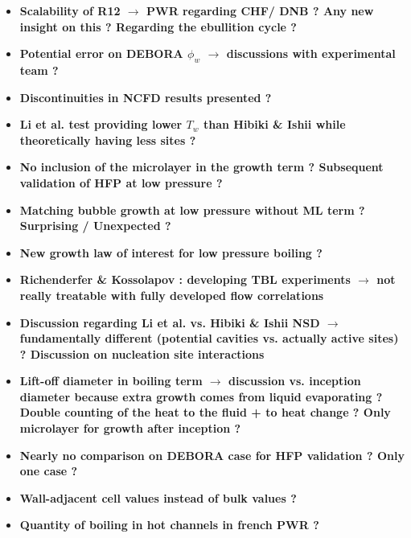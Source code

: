 \documentclass[8pt, a4paper]{article}
\begin{document}
\begin{itemize}
\setlength{\itemsep}{20pt}

\item \textbf{Scalability of R12 $\rightarrow$ PWR regarding CHF/ DNB ? Any new insight on this ? Regarding the ebullition cycle ?}

\item \textbf{Potential error on DEBORA $\phi_{w}$ $\rightarrow$ discussions with experimental team ? }

\item \textbf{Discontinuities in NCFD results presented ?}

\item \textbf{Li et al. test providing lower $T_{w}$ than Hibiki \& Ishii while theoretically having less sites ?}

\item \textbf{No inclusion of the microlayer in the growth term ? Subsequent validation of HFP at low pressure ?}

\item \textbf{Matching bubble growth at low pressure without ML term ? Surprising / Unexpected ?}

\item \textbf{New growth law of interest for low pressure boiling ?}

\item \textbf{Richenderfer \& Kossolapov : developing TBL experiments $\rightarrow$ not really treatable with fully developed flow correlations}

\item \textbf{Discussion regarding Li et al. vs. Hibiki \& Ishii NSD $\rightarrow$ fundamentally different (potential cavities vs. actually active sites) ? Discussion on nucleation site interactions}

\item \textbf{Lift-off diameter in boiling term $\rightarrow$ discussion vs. inception diameter because extra growth comes from liquid evaporating ? Double counting of the heat to the fluid + to heat change ? Only microlayer for growth after inception ?}


\item \textbf{Nearly no comparison on DEBORA case for HFP validation ? Only one case ?}

\item \textbf{Wall-adjacent cell values instead of bulk values ?}


\item \textbf{Quantity of boiling in hot channels in french PWR ?}


\end{itemize}
\end{document}
